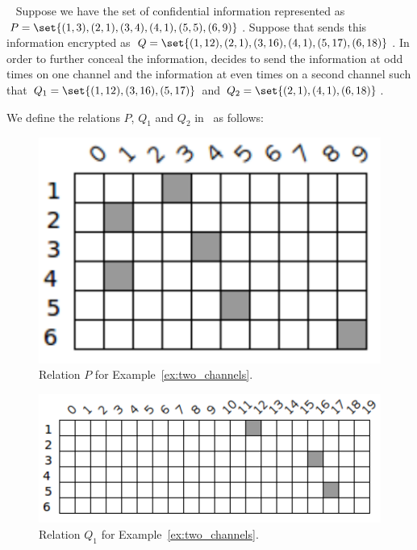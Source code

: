\begin{example}~
\label{ex:two_channels}
	Suppose we have the set of confidential information represented as $P = \set{(1,3),(2,1),(3,4),(4,1),(5,5),(6,9)}$. Suppose that \AgentOne sends this information encrypted as $Q = \set{(1,12),(2,1),(3,16),(4,1),(5,17),(6,18)}$. In order to further conceal the information, \AgentOne decides to send the information at odd times on one channel and the information at even times on a second channel such that $Q_1 = \set{(1,12),(3,16),(5,17)}$ and $Q_2 = \set{(2,1),(4,1),(6,18)}$. \newline 

	We define the relations $P$, $Q_1$ and $Q_2$ in \relview\ as follows: \newline

	\begin{figure}[ht]
		\centering
		\includegraphics[scale=0.65]{Figures/PDF/Relview/P.pdf}
		\caption{Relation $P$ for Example~\ref{ex:two_channels}.}
		\label{fig:two_channels_p}
	\end{figure}
	
	\begin{figure}[ht]
		\centering
		\includegraphics[scale=0.65]{Figures/PDF/Relview/Q1.pdf}
		\caption{Relation $Q_1$ for Example~\ref{ex:two_channels}.}
		\label{fig:two_channels_q1}
	\end{figure}


\end{example}
